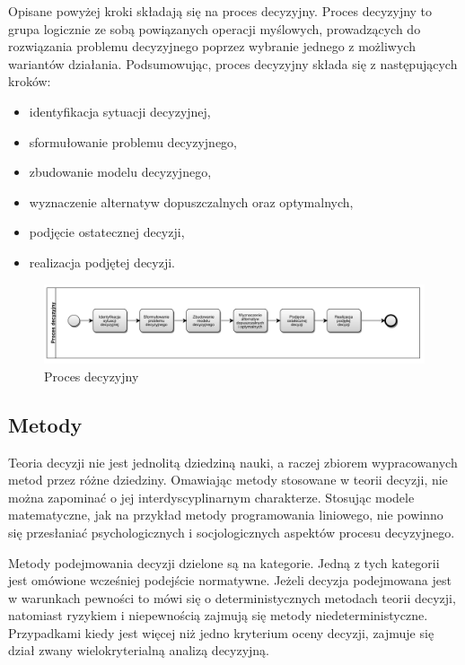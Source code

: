Opisane powyżej kroki składają się na proces decyzyjny. Proces decyzyjny to 
grupa logicznie ze sobą powiązanych operacji myślowych, prowadzących do 
rozwiązania problemu decyzyjnego poprzez wybranie jednego z możliwych wariantów 
działania. Podsumowując, proces decyzyjny składa się z następujących kroków:
\begin{itemize}

\item identyfikacja sytuacji decyzyjnej,

\item sformułowanie problemu decyzyjnego,

\item zbudowanie modelu decyzyjnego,

\item wyznaczenie alternatyw dopuszczalnych oraz optymalnych,

\item podjęcie ostatecznej decyzji,

\item realizacja podjętej decyzji.

\end{itemize}
\begin{figure}[ht]
  \includegraphics[scale=0.52]
  {chapters/decisiontheory/proces_decyzyjny}
  \caption{Proces decyzyjny}
  \label{fig:proces_decyzyjny}
\end{figure}

\subsection{Metody}
Teoria decyzji nie jest jednolitą dziedziną nauki, a raczej zbiorem 
wypracowanych metod przez różne dziedziny. Omawiając metody stosowane w teorii 
decyzji, nie można zapominać o jej interdyscyplinarnym charakterze. Stosując 
modele matematyczne, jak na przykład metody programowania liniowego, nie 
powinno się przesłaniać psychologicznych i socjologicznych aspektów procesu 
decyzyjnego.

Metody podejmowania decyzji dzielone są na kategorie. Jedną z tych kategorii 
jest omówione wcześniej podejście normatywne. Jeżeli decyzja podejmowana jest w 
warunkach pewności to mówi się o deterministycznych metodach teorii decyzji, 
natomiast ryzykiem i niepewnością zajmują się metody niedeterministyczne. 
Przypadkami kiedy jest więcej niż jedno kryterium oceny decyzji, zajmuje się 
dział zwany wielokryterialną analizą decyzyjną.

